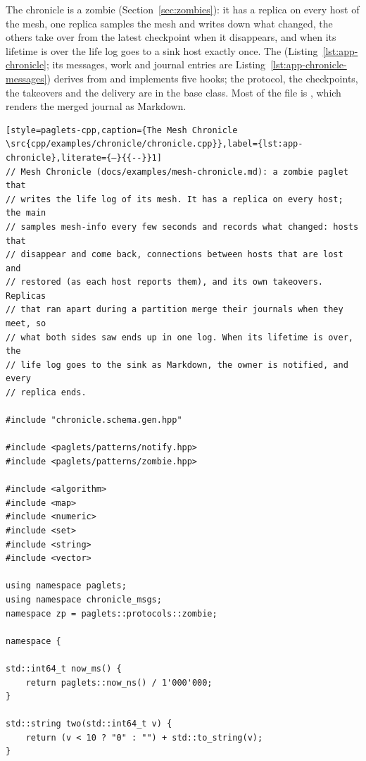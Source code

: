The chronicle is a zombie \paglet{} (Section~\ref{sec:zombies}): it has a
replica on every host of the mesh, one replica samples the mesh and
writes down what changed, the others take over from the latest
checkpoint when it disappears, and when its lifetime is over the life log
goes to a sink host exactly once. The \paglet{}
(Listing~\ref{lst:app-chronicle}; its messages, work and journal entries
are Listing~\ref{lst:app-chronicle-messages}) derives from
 and implements five hooks; the protocol,
the checkpoints, the takeovers and the delivery are in the base class.
Most of the file is , which renders the merged journal as
Markdown.

\begin{lstlisting}[style=paglets-cpp,caption={The Mesh Chronicle \src{cpp/examples/chronicle/chronicle.cpp}},label={lst:app-chronicle},literate={–}{{--}}1]
// Mesh Chronicle (docs/examples/mesh-chronicle.md): a zombie paglet that
// writes the life log of its mesh. It has a replica on every host; the main
// samples mesh-info every few seconds and records what changed: hosts that
// disappear and come back, connections between hosts that are lost and
// restored (as each host reports them), and its own takeovers. Replicas
// that ran apart during a partition merge their journals when they meet, so
// what both sides saw ends up in one log. When its lifetime is over, the
// life log goes to the sink as Markdown, the owner is notified, and every
// replica ends.

#include "chronicle.schema.gen.hpp"

#include <paglets/patterns/notify.hpp>
#include <paglets/patterns/zombie.hpp>

#include <algorithm>
#include <map>
#include <numeric>
#include <set>
#include <string>
#include <vector>

using namespace paglets;
using namespace chronicle_msgs;
namespace zp = paglets::protocols::zombie;

namespace {

std::int64_t now_ms() {
    return paglets::now_ns() / 1'000'000;
}

std::string two(std::int64_t v) {
    return (v < 10 ? "0" : "") + std::to_string(v);
}


\end{lstlisting}
